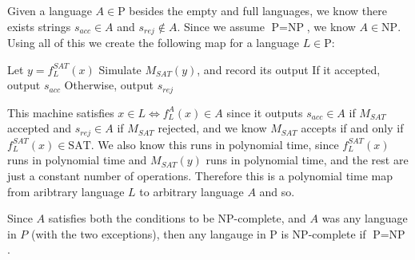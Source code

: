\documentclass[english]{article}
\begin{document}
Given a language $A \in \textrm{P}$ besides the empty and full languages, we 
know there exists strings $s_{acc} \in A$ and $s_{rej} \notin A$. Since
we assume $\textrm{P} = \textrm{NP}$, we know $A \in \textrm{NP}$. Using all of
this we create the following map for a language $L \in \textrm{P}$:
\begin{algorithmic}
\State Let $y = f^{SAT}_L(x)$
\State Simulate $M_{SAT}(y)$, and record its output
\State If it accepted, output $s_{acc}$
\State Otherwise, output $s_{rej}$
\EndFunction 
\end{algorithmic}

This machine satisfies $x \in L \iff f^A_L(x) \in A$ since it outputs 
$s_{acc} \in A$ if $M_{SAT}$ accepted and $s_{rej} \in A$ if $M_{SAT}$
rejected, and we know $M_{SAT}$ accepts if and only if
$f^{SAT}_L(x) \in \textrm{SAT}$. We also know this runs in polynomial time,
since $f^{SAT}_L(x)$ runs in polynomial time and $M_{SAT}(y)$ runs in 
polynomial time, and the rest are just a constant number of operations.
Therefore this is a polynomial time map from aribtrary language $L$ to 
arbitrary language $A$ and so.

Since $A$ satisfies both the conditions to be NP-complete, and $A$ was 
any language in $P$ (with the two exceptions), then any langauge in P is
NP-complete if $\textrm{P} = \textrm{NP}$.
\end{document}
